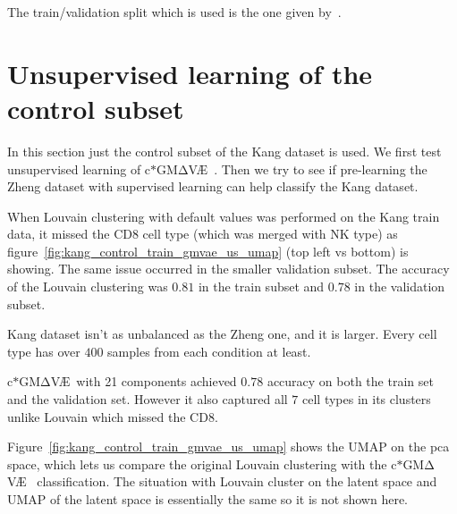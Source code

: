 \documentclass[11pt, a4paper]{report}
\theoremstyle{plain}
\theoremstyle{definition}
\theoremstyle{remark}
\newcommand{\gmvae}{c$\ast$GM$\mathrm{\Delta}$V\AE~}
\begin{document}
The train/validation split which is used is the one given
by~\cite{lotfollahi2019scgen}.

\section{Unsupervised learning of the control subset}

In this section just the control subset of the Kang dataset is used.
We first
test unsupervised learning of \gmvae. Then we try to see if pre-learning the
Zheng dataset with supervised learning can help classify the Kang dataset.

When Louvain clustering with default values was performed on the Kang train data,
it missed the CD8 cell type (which was merged with NK type) as
figure~\ref{fig:kang_control_train_gmvae_us_umap} (top left vs bottom) is showing.
The same issue occurred in
the smaller validation subset.
The accuracy of the Louvain clustering was $0.81$ in the train subset and
$0.78$ in the validation subset.


Kang dataset isn't as unbalanced as the Zheng one, and it is larger.
Every cell type has over $400$ samples from each condition at least.

\gmvae with 21 components achieved $0.78$ accuracy on both the train set and the
validation set. However it also captured all $7$ cell types in its clusters 
unlike Louvain which missed the CD8.

Figure~\ref{fig:kang_control_train_gmvae_us_umap} shows the UMAP on the pca
space, which lets us compare the original Louvain clustering with the \gmvae
classification. The situation with Louvain cluster on the latent space and UMAP
of the latent space is essentially the same so it is not shown here. 
\end{document}
